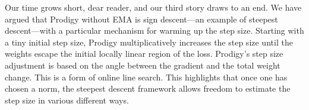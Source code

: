\ornament

Our time grows short, dear reader, and our third story draws to an end. We have argued that Prodigy without EMA is sign descent---an example of steepest descent---with a particular mechanism for warming up the step size. Starting with a tiny initial step size, Prodigy multiplicatively increases the step size until the weights escape the initial locally linear region of the loss. Prodigy's step size adjustment is based on the angle between the gradient and the total weight change. This is a form of online line search. This highlights that once one has chosen a norm, the steepest descent framework allows freedom to estimate the step size in various different ways.













    
